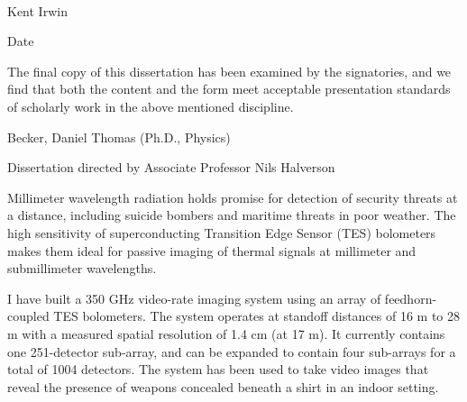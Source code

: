\documentclass[12pt,letterpaper,openany]{memoir}
\numberwithin{equation}{chapter}
\numberwithin{figure}{chapter}
\numberwithin{table}{chapter}
\begin{document}
\begin{center}
  \normalsize
  \vspace*{16mm}
  \vrule width 80mm height 0.2mm\\
  Kent Irwin
\end{center}

\vspace*{9mm}

\begin{flushright}
  Date~{\vrule width 55mm height 0.2mm}
\end{flushright}

\vspace*{\fill}
\begin{center}
  \SingleSpacing
  \parbox{4.50in}{
  The final copy of this dissertation has been examined by
  the signatories, and we find that both the content
  and the form meet acceptable presentation standards
  of scholarly work in the above mentioned discipline.}
\end{center}
\vspace*{\fill}
\newpage



\begin{flushleft}
Becker, Daniel Thomas (Ph.D., Physics)

\thesistitle

Dissertation directed by Associate Professor Nils Halverson
\end{flushleft}

\vspace*{0.7cm}

Millimeter wavelength radiation holds promise for detection of security threats at a distance, including suicide bombers and maritime threats in poor weather.
The high sensitivity of superconducting Transition Edge Sensor (TES) bolometers makes them ideal for passive imaging of thermal signals at millimeter and submillimeter wavelengths.

I have built a 350 GHz video-rate imaging system using an array of feedhorn-coupled TES bolometers.
The system operates at standoff distances of 16 m to 28 m with a measured spatial resolution of 1.4 cm (at 17 m).
It currently contains one 251-detector sub-array, and can be expanded to contain four sub-arrays for a total of 1004 detectors.
The system has been used to take video images that reveal the presence of weapons concealed beneath a shirt in an indoor setting.
\end{document}
